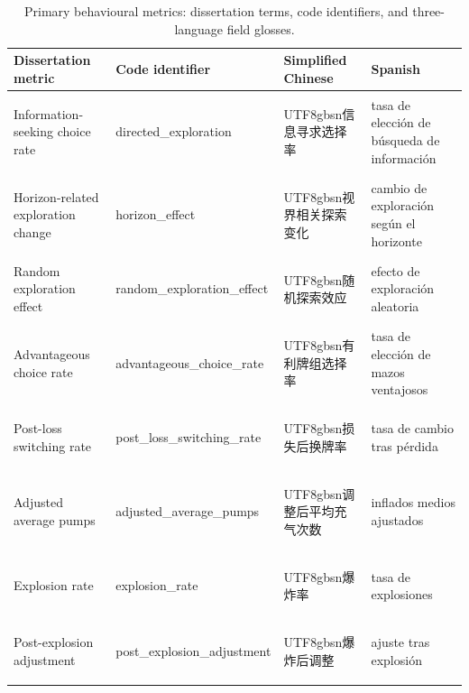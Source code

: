 \documentclass[logo,msc,inf]{infthesis}       %
\begin{document}
\begin{table}[htbp]
\centering
\caption{Primary behavioural metrics: dissertation terms, code identifiers, and three-language field glosses.}
\label{tab:term-metrics}
\setlength{\tabcolsep}{4pt}%
\begin{tabular}{@{}>{\raggedright\arraybackslash}p{3.2cm}>{\raggedright\arraybackslash}p{3.8cm}>{\raggedright\arraybackslash}p{2.4cm}>{\raggedright\arraybackslash}p{3.3cm}@{}}
\toprule
\textbf{Dissertation metric} & \textbf{Code identifier} & \textbf{Simplified Chinese} & \textbf{Spanish} \\
\midrule
Information-seeking choice rate & \footnotesize\ttfamily directed_exploration & {\begin{CJK}{UTF8}{gbsn}信息寻求选择率\end{CJK}} & tasa de elecci\'on de b\'usqueda de informaci\'on \\
Horizon-related exploration change & \footnotesize\ttfamily horizon_effect & {\begin{CJK}{UTF8}{gbsn}视界相关探索变化\end{CJK}} & cambio de exploraci\'on seg\'un el horizonte \\
Random exploration effect & \footnotesize\ttfamily random_exploration_effect & {\begin{CJK}{UTF8}{gbsn}随机探索效应\end{CJK}} & efecto de exploraci\'on aleatoria \\
Advantageous choice rate & \footnotesize\ttfamily advantageous_choice_rate & {\begin{CJK}{UTF8}{gbsn}有利牌组选择率\end{CJK}} & tasa de elecci\'on de mazos ventajosos \\
Post-loss switching rate & \footnotesize\ttfamily post_loss_switching_rate & {\begin{CJK}{UTF8}{gbsn}损失后换牌率\end{CJK}} & tasa de cambio tras p\'erdida \\
Adjusted average pumps & \footnotesize\ttfamily adjusted_average_pumps & {\begin{CJK}{UTF8}{gbsn}调整后平均充气次数\end{CJK}} & inflados medios ajustados \\
Explosion rate & \footnotesize\ttfamily explosion_rate & {\begin{CJK}{UTF8}{gbsn}爆炸率\end{CJK}} & tasa de explosiones \\
Post-explosion adjustment & \footnotesize\ttfamily post_explosion_adjustment & {\begin{CJK}{UTF8}{gbsn}爆炸后调整\end{CJK}} & ajuste tras explosi\'on \\
\bottomrule
\end{tabular}
\end{table}
\end{document}
